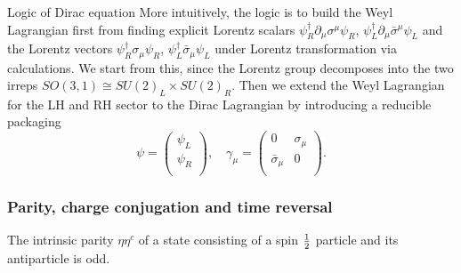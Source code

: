 \begin{mybox}{Logic of Dirac equation}
	More intuitively, the logic is to build the Weyl Lagrangian first from finding explicit Lorentz scalars $\psi^\dagger_R\partial_\mu \sigma^\mu \psi_R$, $\psi^\dagger_L \partial_\mu \bar{\sigma}^\mu \psi_L$ and the Lorentz vectors $\psi^\dagger_R \sigma_\mu \psi_R$, $\psi^\dagger_L \bar{ \sigma }_\mu \psi_L$ under Lorentz transformation via calculations. We start from this, since the Lorentz group decomposes into the two irreps $SO(3,1) \cong SU(2)_L \times SU(2)_R$. Then we extend the Weyl Lagrangian for the LH and RH sector to the Dirac Lagrangian by introducing a reducible packaging
	\begin{equation*}
		\psi = \begin{pmatrix}
			\psi_L \\
			\psi_R \\
		\end{pmatrix}
	,\quad \gamma_\mu  = \begin{pmatrix}
		0 & \sigma_\mu \\
		\bar{ \sigma }_\mu &0 \\
	\end{pmatrix}.
	\end{equation*}
\end{mybox}
\subsubsection{Parity, charge conjugation and time reversal}
The intrinsic parity $\eta \eta^c$ of a state consisting of a spin $\frac{1}{2}$ particle and its antiparticle is odd.
